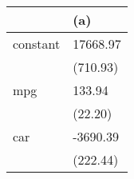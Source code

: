 \begin{tabular}{ll}
\toprule
{} &       (a) \\
\midrule
constant &  17668.97 \\
         &  (710.93) \\
mpg      &    133.94 \\
         &   (22.20) \\
car      &  -3690.39 \\
         &  (222.44) \\
\bottomrule
\end{tabular}
